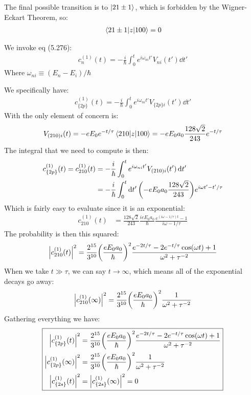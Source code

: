 \documentclass[12pt]{article}
\begin{document}
The final possible transition is to $\ket{21\pm1}$, which is forbidden by the Wigner-Eckart Theorem, so:
\begin{align*}
  \mel{21\pm1}{z}{100}=0
\end{align*}
\begin{thebook*}
  We invoke eq (5.276):
  \begin{align*}
    c_{n}^{(1)}(t)=-\frac{i}{\hbar}\int_0^t e^{i\omega_{ni}t'}V_{ni}(t')\dd{t'}
  \end{align*}
  Where $\omega_{ni}\equiv(E_n-E_i)/\hbar$
\end{thebook*}
We specifically have:
  \begin{align*}
    c_{\{2p\}}^{(1)}(t)=-\frac{i}{\hbar}\int_0^t e^{i\omega_{ni}t'}V_{\{2p\}i}(t')\dd{t'}
  \end{align*}
With the only element of concern is:
\begin{align*}
  V_{(210)i}(t)=-eE_0e^{-t/\tau}\mel{210}{z}{100}=
  -eE_0a_0\frac{128\sqrt{2}}{243}e^{-t/\tau}
\end{align*}
The integral that we need to compute is then:
\begin{align*}
  c_{\{2p\}}^{(1)}(t)=c_{210}^{(1)}(t)&=-\frac{i}{\hbar}
  \int_0^t e^{i\omega_{ni}t'}V_{(210)i}(t')\dd{t'}\\
  &=-\frac{i}{\hbar}\int_0^t\dd{t'}\qty(-eE_0a_0\frac{128\sqrt{2}}{243})
  e^{i\omega t'-t'/\tau}
\end{align*}
Which is fairly easy to evaluate since it is an exponential:
\begin{align*}
  c_{210}^{(1)}(t)&=\frac{128\sqrt{2}}{243}\frac{ieE_0a_0}\hbar
  \frac{e^{(i\omega-1/\tau)t}-1}{i\omega-1/\tau}
\end{align*}
The probability is then this squared:
\begin{align*}
  \abs{c_{210}^{(1)}(t)}^2=
  \frac{2^{15}}{3^{10}}\qty(\frac{eE_0a_0}\hbar)^2
  \frac{e^{-2t/\tau}-2e^{-t/\tau}\cos(\omega t)+1}{\omega^2+\tau^{-2}}
\end{align*}
When we take $t\gg\tau$, we can say $t\to\infty$, which means all of the exponential decays go away:
\begin{align*}
  \abs{c_{210}^{(1)}(\infty)}^2=
  \frac{2^{15}}{3^{10}}\qty(\frac{eE_0a_0}\hbar)^2\frac1{\omega^2+\tau^{-2}}
\end{align*}
Gathering everything we have:
\begin{equation}
\boxed{  \begin{aligned}
    \abs{c_{\{2p\}}^{(1)}(t)}^2&=\frac{2^{15}}{3^{10}}\qty(\frac{eE_0a_0}\hbar)^2
    \frac{e^{-2t/\tau}-2e^{-t/\tau}\cos(\omega t)+1}{\omega^2+\tau^{-2}}\\
    \abs{c_{\{2p\}}^{(1)}(\infty)}^2&=\frac{2^{15}}{3^{10}}
    \qty(\frac{eE_0a_0}\hbar)^2\frac1{\omega^2+\tau^{-2}}\\
    \abs{c_{\{2s\}}^{(1)}(t)}^2&=\abs{c_{\{2s\}}^{(1)}(\infty)}^2=0
  \end{aligned}}
\end{equation}
\end{document}
